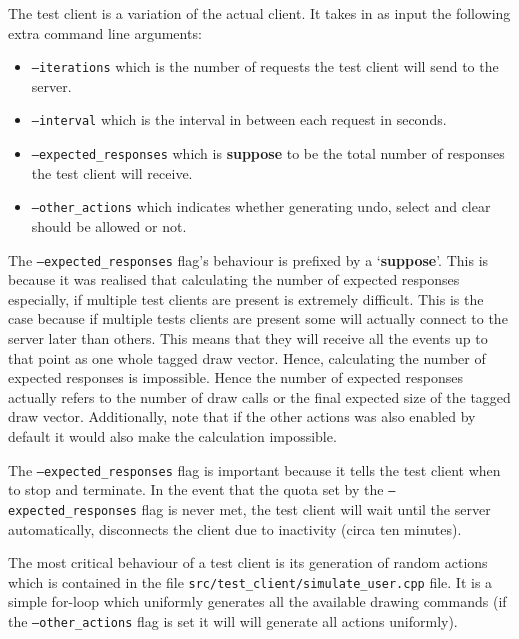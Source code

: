 \documentclass[article]{uom-coursework}
\begin{document}
The test client is a variation of the actual client. It
takes in as input the following extra command line arguments:

\begin{itemize}
    \item \texttt{--iterations} which is the number of requests
        the test client will send to the server.
    \item \texttt{--interval} which is the interval in between
        each request in seconds.
    \item \texttt{--expected\_responses} which is
        \textbf{suppose} to be the total number of responses the
        test client will receive.
    \item \texttt{--other\_actions} which indicates whether
        generating undo, select and clear should be allowed or
        not.
\end{itemize}

\begin{marker}
    The \texttt{--expected\_responses} flag's behaviour is
    prefixed by a `\textbf{suppose}'. This is because it was
    realised that calculating the number of expected
    responses especially, if multiple test clients are present
    is extremely difficult. This is the case because if multiple
    tests clients are present some will actually connect to the
    server later than others. This means that they will receive
    all the events up to that point as one whole tagged draw
    vector. Hence, calculating the number of expected responses
    is impossible. Hence the number of expected responses
    actually refers to the number of draw calls or the final
    expected size of the tagged draw vector. Additionally, note
    that if the other actions was also enabled by default it
    would also make the calculation impossible.
\end{marker}

The \texttt{--expected\_responses} flag is important because it
tells the test client when to stop and terminate. In the event
that the quota set by the \texttt{--expected\_responses} flag is
never met, the test client will wait until the server
automatically, disconnects the client due to inactivity (circa
ten minutes).

The most critical behaviour of a test client is its generation
of random actions which is contained in the file
\texttt{src/test\_client/simulate\_user.cpp} file. It is a
simple for-loop which uniformly generates all the available
drawing commands (if the \texttt{--other\_actions} flag is set
it will will generate all actions uniformly).
\end{document}
